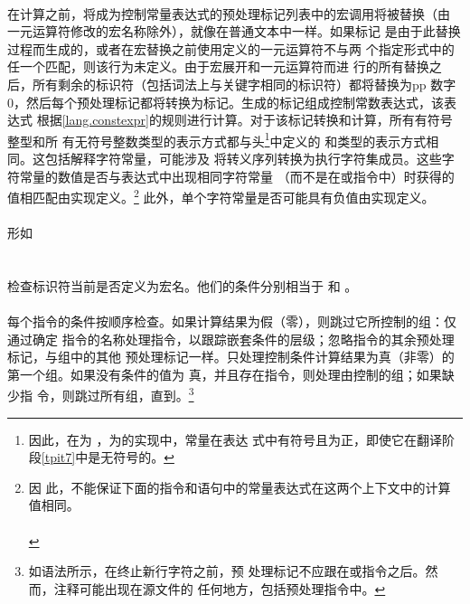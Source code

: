 \paragraph{}
在计算之前，将成为控制常量表达式的预处理标记列表中的宏调用将被替换（由
一元运算符修改的宏名称除外），就像在普通文本中一样。如果标记
是由于此替换过程而生成的，或者在宏替换之前使用定义的一元运算符不与两
个指定形式中的任一个匹配，则该行为未定义。由于宏展开和一元运算符而进
行的所有替换之后，所有剩余的标识符（包括词法上与关键字相同的标识符）都将替换为pp
数字0，然后每个预处理标记都将转换为标记。生成的标记组成控制常数表达式，该表达式
根据\ref{lang.constexpr}的规则进行计算。对于该标记转换和计算，所有有符号整型和所
有无符号整数类型的表示方式都与头\footnote{因此，在为
，为的实现中，常量在表达
式中有符号且为正，即使它在翻译阶段\ref{tpit7}中是无符号的。}中定义的
和类型的表示方式相同。这包括解释字符常量，可能涉及
将转义序列转换为执行字符集成员。这些字符常量的数值是否与表达式中出现相同字符常量
（而不是在或指令中）时获得的值相匹配由实现定义。\footnote{因
此，不能保证下面的指令和语句中的常量表达式在这两个上下文中的计算
值相同。                                                                      \\
\mbox{\hspace{4em}}                                  \\
\mbox{\hspace{4em}}
} 此外，单个字符常量是否可能具有负值由实现定义。

\paragraph{}
形如                                                                          \\
\mbox{} \\
\mbox{}  \\
检查标识符当前是否定义为宏名。他们的条件分别相当于
和 。

\paragraph{}
每个指令的条件按顺序检查。如果计算结果为假（零），则跳过它所控制的组：仅通过确定
指令的名称处理指令，以跟踪嵌套条件的层级；忽略指令的其余预处理标记，与组中的其他
预处理标记一样。只处理控制条件计算结果为真（非零）的第一个组。如果没有条件的值为
真，并且存在指令，则处理由控制的组；如果缺少指
令，则跳过所有组，直到。\footnote{如语法所示，在终止新行字符之前，预
处理标记不应跟在或指令之后。然而，注释可能出现在源文件的
任何地方，包括预处理指令中。}

